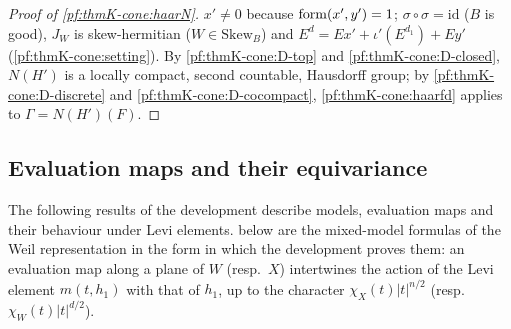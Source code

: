 \begin{proof}[Proof of \cref{pf:thmK-cone:haarN}]
$x'\neq0$ because $\operatorname{form}(x',y')=1$; $\sigma\circ\sigma=\mathrm{id}$ ($B$ is good), $J_W$ is skew-hermitian
($W\in\mathrm{Skew}_B$) and $E^d=Ex'+\iota'(E^{d_1})+Ey'$ (\cref{pf:thmK-cone:setting}).  By
\ref{pf:thmK-cone:D-top} and \ref{pf:thmK-cone:D-closed}, $N(H')$ is a locally compact, second countable, Hausdorff
group; by \ref{pf:thmK-cone:D-discrete} and \ref{pf:thmK-cone:D-cocompact}, \cref{pf:thmK-cone:haarfd} applies to
$\Gamma=N(H')(F)$.
\end{proof}

\subsection{Evaluation maps and their equivariance}\label{pf:thmK-cone:evmaps}

The following results of the development describe models, evaluation maps and their behaviour under Levi
elements.   below are the mixed-model formulas of the Weil
representation in the form in which the development proves them: an evaluation map along a plane of $W$ (resp.\ $X$)
intertwines the action of the Levi element $m(t,h_1)$ with that of $h_1$, up to the character $\chi_X(t)|t|^{n/2}$
(resp.\ $\chi_W(t)|t|^{d/2}$).

